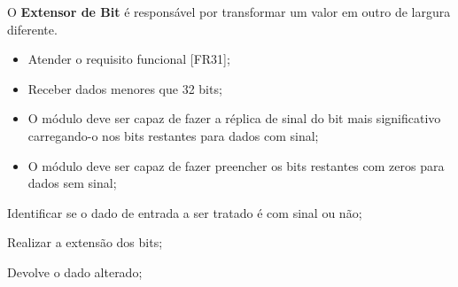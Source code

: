 O \textbf{Extensor de Bit} é responsável por transformar um valor em outro de largura diferente.
  
\actors
	\begin{description}
	\end{description}
  
\preconditions 
	\begin{itemize}
	\item Atender o requisito funcional [FR31];
	\item Receber dados menores que 32 bits;
	\end{itemize}

\postconditions
    \begin{itemize}
     \item O módulo deve ser capaz de fazer a réplica de sinal do bit mais significativo carregando-o nos bits restantes para dados com sinal;
     \item O módulo deve ser capaz de fazer preencher os bits restantes com zeros para dados sem sinal;
     \end{itemize}
  
\begin{mainflow}
\item Identificar se o dado de entrada a ser tratado é com sinal ou não;
\item Realizar a extensão dos bits;
\item Devolve o dado alterado;
\end{mainflow}
  

